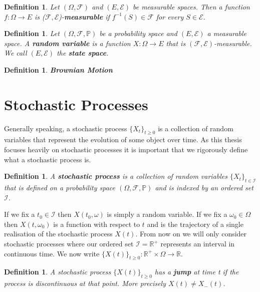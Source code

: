 \documentclass[honours,12pt]{UNSWthesis}
\newcommand{\R}{\mathbb{R}}
\newcommand{\PP}{\mathbb{P}}
\newcommand{\Rp}{\mathbb R^+}
\newcommand{\1}{\mathbf 1}
\newcommand{\FF}{\mathcal{F}}
\newtheorem{definition}[theorem]{Definition}
\numberwithin{equation}{section}
\theoremstyle{definition}
\theoremstyle{remark}
\begin{document}
\begin{definition}
Let $(\Omega,\FF)$ and $(E,\mathcal{E})$ be measurable spaces. Then a function $f: \Omega \rightarrow E$ is ($\FF,\mathcal{E}$)-\textbf{measurable} if $f^{-1}(S)\in \FF$ for every $S\in \mathcal{E}$.\\
\end{definition}

\begin{definition}
Let $(\Omega,\FF,\PP)$ be a probability space and $(E,\mathcal{E})$ a measurable space. A \textbf{random variable} is a function $X:\Omega \rightarrow E$ that is $(\FF,\mathcal{E})$-measurable. We call $(E,\mathcal{E})$ the \textbf{state space}. \\
\end{definition}

\begin{definition}
\textbf{Brownian Motion}
\end{definition}

\section{Stochastic Processes}
Generally speaking, a stochastic process $\{X_t\}_{t\geq 0}$ is a collection of random variables that represent the evolution of some object over time. As this thesis focuses heavily on stochastic processes it is important that we rigorously define what a stochastic process is.\\

\begin{definition}
A \textbf{stochastic process} is a collection of random variables $\{X_t\}_{t\in \mathcal{I}}$ that is defined on a probability space $(\Omega, \FF,\PP)$ and is indexed by an ordered set $\mathcal{I}$. \\
\end{definition}

\noindent If we fix a $t_0\in \mathcal{I}$ then $X(t_0,\omega)$ is simply a random variable. If we fix a $\omega_0\in \Omega$ then $X(t,\omega_0)$ is a function with respect to $t$ and is the trajectory of a single realisation of the stochastic process $X(t)$. From now on we will only consider stochastic processes where our ordered set $\mathcal{I}=\Rp$ represents an interval in continuous time. We now write $\{X(t)\}_{t\geq 0}:\Rp\times\Omega\to\R$.\\ 

\begin{definition}
A stochastic process $\{X(t)\}_{t\geq 0}$ has a \textbf{jump} at time t if the process is discontinuous at that point. More precisely $X(t) \neq X_-(t)$.\\
\end{definition}
\end{document}
